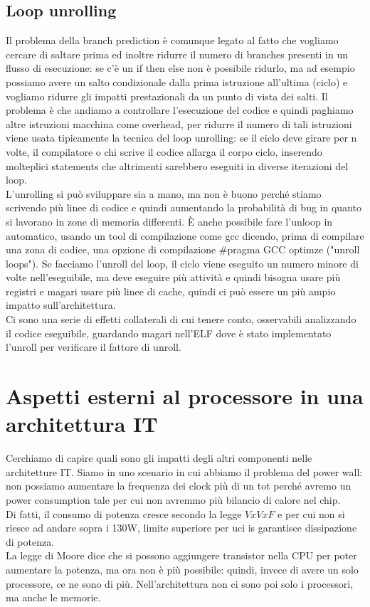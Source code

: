 \documentclass[14pt, oneside]{book}
\begin{document}
\subsection{Loop unrolling}
Il problema della branch prediction è comunque legato al fatto che vogliamo cercare di saltare prima ed inoltre ridurre il numero di branches presenti in un flusso di esecuzione: se c'è un if then else non è possibile ridurlo, ma ad esempio possiamo avere un salto condizionale dalla prima istruzione all'ultima (ciclo) e vogliamo ridurre gli impatti prestazionali da un punto di vista dei salti. Il problema è che andiamo a controllare l'esecuzione del codice e quindi paghiamo altre istruzioni macchina come overhead, per ridurre il numero di tali istruzioni viene usata tipicamente la tecnica del loop unrolling: se il ciclo deve girare per n volte, il compilatore o chi scrive il codice allarga il corpo ciclo, inserendo molteplici statements che altrimenti sarebbero eseguiti in diverse iterazioni del loop.\\
L'unrolling si può sviluppare sia a mano, ma non è buono perché stiamo scrivendo più linee di codice e quindi aumentando la probabilità di bug in quanto si lavorano in zone di memoria differenti. È anche possibile fare l'unloop in automatico, usando un tool di compilazione come gcc dicendo, prima di compilare una zona di codice, una opzione di compilazione \textsf{\#pragma GCC optimze ("unroll loops")}. Se facciamo l'unroll del loop, il ciclo viene eseguito un numero minore di volte nell'eseguibile, ma deve eseguire più attività e quindi bisogna usare più registri e magari usare più linee di cache, quindi ci può essere un più ampio impatto sull'architettura.\\ Ci sono una serie di effetti collaterali di cui tenere conto, osservabili analizzando il codice eseguibile, guardando magari nell'ELF dove è stato implementato l'unroll per verificare il fattore di unroll.
\section{Aspetti esterni al processore in una architettura IT}
Cerchiamo di capire quali sono gli impatti degli altri componenti nelle architetture IT. Siamo in uno scenario in cui abbiamo il problema del power wall: non possiamo aumentare la frequenza dei clock più di un tot perché avremo un power consumption tale per cui non avremmo più bilancio di calore nel chip.\\ Di fatti, il consumo di potenza cresce secondo la legge $VxVxF$ e per cui non si riesce ad andare sopra i 130W, limite superiore per uci is garantisce dissipazione di potenza.\\ La legge di Moore dice che si possono aggiungere transistor nella CPU per poter aumentare la potenza, ma ora non è più possibile: quindi, invece di avere un solo processore, ce ne sono di più. Nell'architettura non ci sono poi solo i processori, ma anche le memorie.
\end{document}

